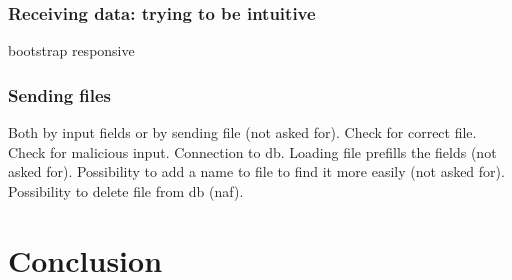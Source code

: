 \documentclass{themeensg}
\begin{document}
\subsection{Receiving data: trying to be intuitive}

bootstrap
responsive


\newpage
\subsection{Sending files}

Both by input fields or by sending file (not asked for). Check for correct file. Check for malicious input. Connection to db. Loading file prefills the fields (not asked for). Possibility to add a name to file to find it more easily (not asked for). Possibility to delete file from db (naf). 
\newevenpage
\chapter*{Conclusion}
  \vspace{1.5cm}

\newevenpage
\begin{appendices} 
\label{beginappendices}

\label{configfile}



\end{appendices}
\end{document}
